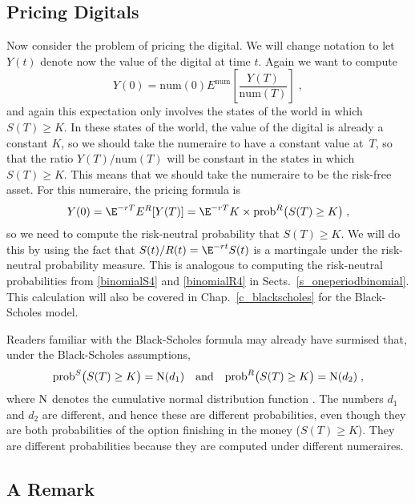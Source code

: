 \subsection*{Pricing Digitals}
Now consider the problem of pricing the digital.  We will change notation to let $Y(t)$ denote now the value of the digital at time $t$.  Again we want to compute
$$Y(0) = \text{num}(0) E^\text{num}\left[\frac{Y(T)}{\text{num}(T)}\right]\; ,$$
and again this expectation only involves the states of the world in which $S(T) \geq K$.  In these states of the world, the value of the digital is already a constant $K$, so we should take the numeraire to have a constant value at~$T$, so that the ratio $Y(T)/\text{num}(T)$ will be constant in the states in which $S(T) \geq K$.  This means that we should take the numeraire to be the risk-free asset.  For this numeraire, the pricing formula is
$$Y(0) = \E^{-rT}E^R[Y(T)] = \E^{-rT}K\times \text{prob}^R \big(S(T)\geq K\big)\; ,$$
so we need to compute the risk-neutral probability that $S(T) \geq K$.   We will do this by using the fact that $S(t)/R(t) = \E^{-rt}S(t)$ is a martingale under the risk-neutral probability measure.  This is analogous to computing the risk-neutral probabilities from  \eqref{binomialS4} and \eqref{binomialR4} in Sects.~\ref{s_oneperiodbinomial}.
This calculation will also be covered in Chap.~\ref{c_blackscholes} for the Black-Scholes model.


Readers familiar with the Black-Scholes formula may already have surmised that, under the Black-Scholes assumptions, 
$$\text{prob}^S\big(S(T)\geq K\big) = \operatorname{N}(d_1) \quad \text{and} \quad \text{prob}^R\big(S(T)\geq K\big) = \operatorname{N}(d_2)\; ,$$ where $\operatorname{N}$ denotes the cumulative normal distribution function .  The numbers $d_1$ and $d_2$ are different, and hence these are different probabilities, even though they are both probabilities of the option finishing in the money ($S(T) \geq K$).  They are different probabilities because they are computed under different numeraires.  

\subsection*{A Remark}


